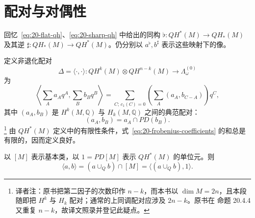 \section{\personFrobenius{}配对与对偶性}
\label{sec:frobenius-pairing-duality}

回忆~\eqref{eq:20-flat-qh}、\eqref{eq:20-sharp-qh} 中给出的同构
$\flat:QH^*(M)\to QH_*(M)$ 及其逆
$\sharp:QH_*(M)\to QH^*(M)$。仍分别以 $a^\flat,b^\sharp$ 表示这些映射下的像。

\begin{definition}[\personFrobenius{}配对]
\label{def:20-frobenius-pairing}
定义非退化配对
\begin{equation}
 \Delta=\langle\cdot,\cdot\rangle:
 QH^k(M)\otimes QH^{n-k}(M)\longrightarrow\Lambda_\omega^{(0)}
 \label{eq:20-frobenius-pairing}
\end{equation}
为
\begin{equation}
 \left\langle\sum_Aa_Aq^A,\sum_Bb_Bq^B\right\rangle
 =\sum_{C;\,c_1(C)=0}\left(\sum_A(a_A,b_{C-A})\right)q^C,
 \label{eq:20-frobenius-coefficients}
\end{equation}
其中 $(a_A,b_B)$ 是 $H^k(M,\mathbb Q)$ 与 $H_k(M,\mathbb Q)$ 之间的典范\personPoincare{}配对：
\[
 (a_A,b_B)=a_A\cap PD(b_B).
\]
\footnote{译者注：原书把第二因子的次数印作 $n-k$，而本书以 $\dim M=2n$，且本段
随即把 $H^k$ 与 $H_k$ 配对；通常的上同调\personPoincare{}配对应涉及 $2n-k$。原书在
命题 20.4.4 又重复 $n-k$，故译文照录并登记此疑点。}
由 $QH^*(M)$ 定义中的有限性条件，式~\eqref{eq:20-frobenius-coefficients} 的和总是
有限的，因而定义良好。
\end{definition}

\begin{proposition}
\label{prop:20-frobenius-cup}
以 $[M]$ 表示基本类，以 $1=PD[M]$ 表示 $QH^*(M)$ 的单位元。则
\[
 \langle a,b\rangle=(a\cup_Qb)\cap[M]=\langle(a\cup_Qb),1\rangle.
\]
\end{proposition}

